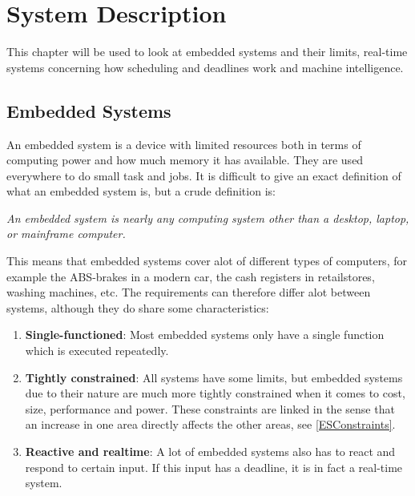 \chapter{System Description}
This chapter will be used to look at embedded systems and their limits,
real-time systems concerning how scheduling and deadlines work and machine
intelligence.

\section{Embedded Systems}
An embedded system is a device with limited resources both in terms of computing
power and how much memory it has available. They are used everywhere to do small task and
jobs. It is difficult to give an exact definition of what an embedded system is,
but a crude definition\citep[ch.1.1]{vahid1999embedded} is:\nl

\textit{An  embedded  system  is  nearly  any computing system other than a desktop,
laptop, or  mainframe  computer.}\nl

This means that embedded systems cover alot of different types of computers, for example
the ABS-brakes in a modern car, the cash registers in retailstores, washing machines, etc.
The requirements can therefore differ alot between systems, although they do
share some characteristics:

\begin{enumerate}
  \item \textbf{Single-functioned}:  Most embedded systems only have a single
  function which is executed repeatedly.
  \item \textbf{Tightly constrained}: All systems have some limits, but embedded
  systems due to their nature are much more tightly constrained when it comes to
  cost, size, performance and power. These constraints are linked in the sense
  that an increase in one area directly affects the other areas, see
  \autoref{ESConstraints}.
  \item \textbf{Reactive and realtime}: A lot of embedded systems also has to
  react and respond to certain input. If this input has a deadline, it is in
  fact a real-time system.
\end{enumerate}
	





